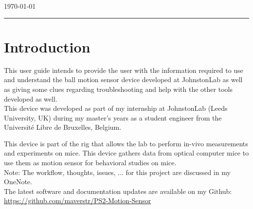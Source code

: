 \documentclass[a4paper]{article}
\begin{document}
\begin{titlepage}


{\large \today}\\[2cm] %


\vfill %

\end{titlepage}


\noindent\rule{\textwidth}{1pt}

\tableofcontents

\newpage

\listoffigures

\newpage



\section{Introduction}
This user guide intends to provide the user with the information required to use and understand the ball motion sensor device developed at JohnstonLab as well as giving some clues regarding troubleshooting and help with the other tools developed as well.\\

This device was developed as part of my internship at JohnstonLab (Leeds University, UK) during my master's years as a student engineer from the Université Libre de Bruxelles, Belgium.

This device is part of the rig that allows the lab to perform in-vivo measurements and experiments on mice. This device gathers data from optical computer mice to use them as motion sensor for behavioral studies on mice.\\

Note: The workflow, thoughts, issues, ... for this project are discussed in my OneNote.\\

The latest software and documentation updates are available on my Github: \url{https://github.com/maverstr/PS2-Motion-Sensor}
\end{document}

